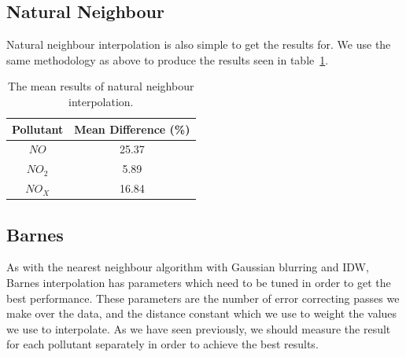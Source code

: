         \subsection{Natural Neighbour}\label{prediction_evaluation_results_natural_neighbour}



        	Natural neighbour interpolation is also simple to get the results for. We use the same methodology as above to produce the results seen in table~\ref{tab:natural_neighbour_results}.

        	\begin{table}[H]
				\centering
	    		\begin{tabular}{|c|c|}
	    			\hline
					Pollutant & Mean Difference (\%) \\ \hline
					$NO$ & 25.37 \\
					$NO_{2}$ & 5.89 \\
					$NO_{X}$ & 16.84 \\
					\hline
				\end{tabular}
				\caption{The mean results of natural neighbour interpolation.}
				\label{tab:natural_neighbour_results}
			\end{table} 

        \subsection{Barnes}\label{prediction_evaluation_results_barnes}


        	As with the nearest neighbour algorithm with Gaussian blurring and IDW, Barnes interpolation has parameters which need to be tuned in order to get the best performance. These parameters are the number of error correcting passes we make over the data, and the distance constant which we use to weight the values we use to interpolate. As we have seen previously, we should measure the result for each pollutant separately in order to achieve the best results. 


